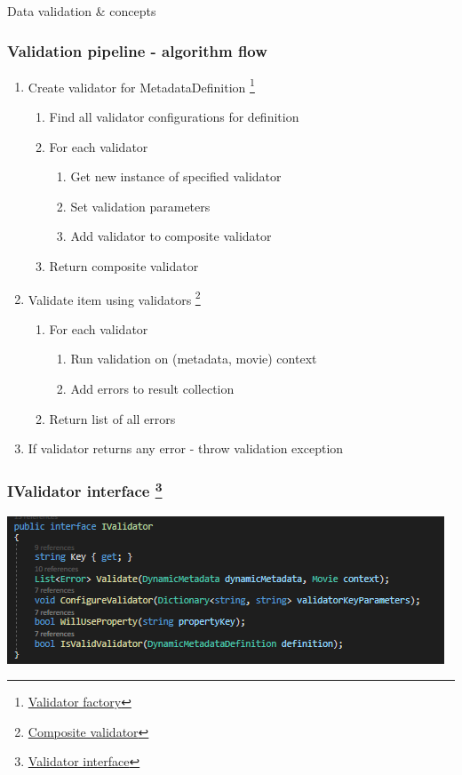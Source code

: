 \documentclass{beamer}
\begin{document}
\begin{section}{Data validation \& concepts}
\begin{frame}
\frametitle{Validation pipeline - algorithm flow}
\begin{enumerate}
	\item Create validator for MetadataDefinition \footnote[1]{ \href{https://github.com/paqaos/DynamicMetadata-SFI2021/blob/main/MovieDatabase/MovieDatabase/Services/Validation/ValidationFactory.cs}{Validator factory}}
		\begin{enumerate}
			\item Find all validator configurations for definition
			\item For each validator
				\begin{enumerate}
					\item Get new instance of specified validator
					\item Set validation parameters
					\item Add validator to composite validator
				\end{enumerate}
			\item Return composite validator
		\end{enumerate}
	\item Validate item using validators  \footnote[2]{ \href{https://github.com/paqaos/DynamicMetadata-SFI2021/blob/main/MovieDatabase/MovieDatabase/Services/Validation/CompositeValidator.cs}{Composite validator}}
		\begin{enumerate}
			\item For each validator
				\begin{enumerate}
					\item Run validation on (metadata, movie) context
					\item Add errors to result collection
				\end{enumerate}
			\item Return list of all errors
		\end{enumerate}
	\item If validator returns any error - throw validation exception
\end{enumerate}
\end{frame}

\begin{frame}
\frametitle{IValidator interface \footnote[1]{\href{https://github.com/paqaos/DynamicMetadata-SFI2021/blob/main/MovieDatabase/MovieDatabase/Services/Validation/IValidator.cs}{Validator interface}}}

\centering
 \includegraphics{IValidator.png}


\end{frame}
\end{section}
\end{document}

